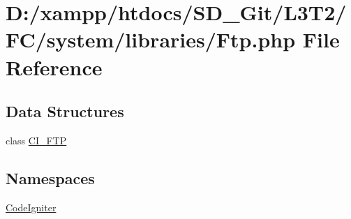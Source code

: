 \hypertarget{_ftp_8php}{}\section{D\+:/xampp/htdocs/\+S\+D\+\_\+\+Git/\+L3\+T2/\+F\+C/system/libraries/\+Ftp.php File Reference}
\label{_ftp_8php}
\subsection*{Data Structures}
\begin{DoxyCompactItemize}
\item 
class \hyperlink{class_c_i___f_t_p}{C\+I\+\_\+\+F\+T\+P}
\end{DoxyCompactItemize}
\subsection*{Namespaces}
\begin{DoxyCompactItemize}
\item 
 \hyperlink{namespace_code_igniter}{Code\+Igniter}
\end{DoxyCompactItemize}
